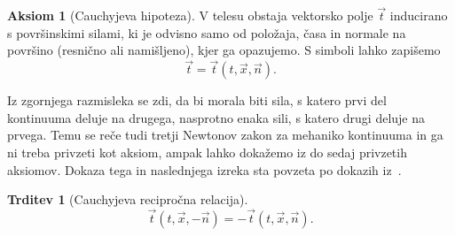 \documentclass[12pt,a4paper,twoside]{article}
\theoremstyle{definition} %
\newtheorem{aksiom}{Aksiom}
\theoremstyle{plain} %
\newtheorem{trditev}[definicija]{Trditev}
\numberwithin{equation}{section}
\newcommand{\vt}{\vec{t}}
\newcommand{\vn}{\vec{n}}
\newcommand{\vx}{\vec{x}}
\begin{document}
\begin{aksiom}[Cauchyjeva hipoteza]
  V telesu obstaja vektorsko polje $\vt$ inducirano s površinskimi silami, ki
  je odvisno samo od položaja, časa in normale na površino (resnično ali
  namišljeno), kjer ga opazujemo.  S simboli lahko zapišemo
  \begin{equation}
    \vt = \vt(t, \vx, \vn).
  \end{equation}
\end{aksiom}

Iz zgornjega razmisleka se zdi, da bi morala biti sila, s katero prvi del
kontinuuma deluje na drugega, nasprotno enaka sili, s katero drugi deluje na
prvega. Temu se reče tudi tretji Newtonov zakon za mehaniko kontinuuma in
ga ni treba privzeti kot aksiom, ampak lahko dokažemo iz do sedaj
privzetih aksiomov. Dokaza tega in naslednjega izreka sta povzeta po dokazih
iz~\cite[str.\ 104--107]{hjelmstad2007fundamentals}.
\begin{trditev}[Cauchyjeva recipročna relacija]
  \label{trd:cauchy-reciprocal}
  \begin{equation}
    \vt(t, \vx, -\vn) = -\vt(t, \vx, \vn).
    \label{eq:cauchy-reciprocal}
  \end{equation}
\end{trditev}
\end{document}
